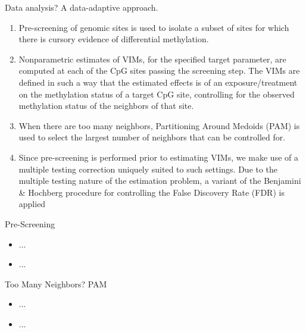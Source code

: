 \documentclass[12pt,t]{beamer}
\begin{document}
\begin{frame}[c]{Data analysis? A data-adaptive approach.}

\begin{center}
\begin{enumerate}
  \item Pre-screening of genomic sites is used to isolate a subset of sites for
    which there is cursory evidence of differential methylation.
  \item Nonparametric estimates of VIMs, for the specified target parameter, are
   computed at each of the CpG sites passing the screening step. The VIMs are
   defined in such a way that the estimated effects is of an exposure/treatment
   on the methylation status of a target CpG site, controlling for the observed
   methylation status of the neighbors of that site.
 \item When there are too many neighbors, Partitioning Around Medoids (PAM) is
   used to select the largest number of neighbors that can be controlled for.
 \item Since pre-screening is performed prior to estimating VIMs, we make use of a
   multiple testing correction uniquely suited to such settings. Due to the
   multiple testing nature of the estimation problem, a variant of the Benjamini
   \& Hochberg procedure for controlling the False Discovery Rate (FDR) is
   applied
\end{enumerate}
\end{center}

\note{
}

\end{frame}


\begin{frame}[c]{Pre-Screening}

\begin{center}
\begin{itemize}
  \item ...
  \item ...
\end{itemize}
\end{center}

\note{
}

\end{frame}


\begin{frame}[c]{Too Many Neighbors? PAM}

\begin{center}
\begin{itemize}
  \item ...
  \item ...
\end{itemize}
\end{center}

\note{
}

\end{frame}
\end{document}
